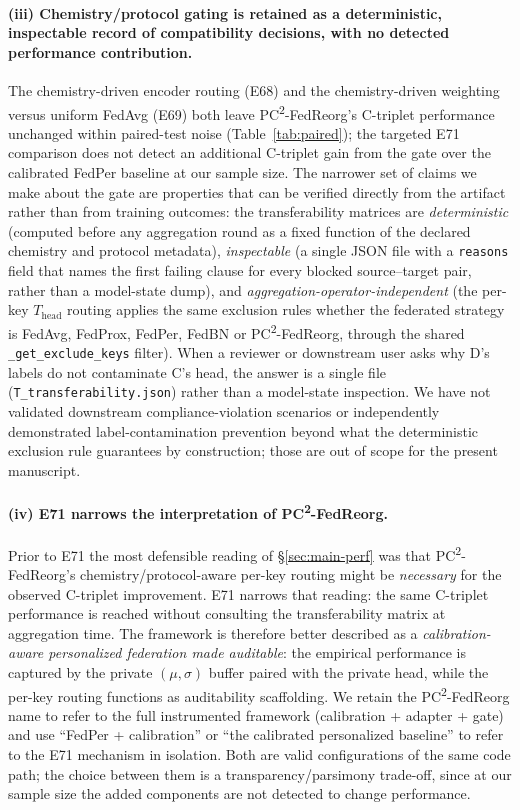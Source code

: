 \documentclass[11pt,a4paper]{article}
\newcommand{\PC}{PC\textsuperscript{2}-FedReorg}
\begin{document}
\paragraph{(iii) Chemistry/protocol gating is retained as a deterministic, inspectable record of compatibility decisions, with no detected performance contribution.} The chemistry-driven encoder routing (E68) and the chemistry-driven weighting versus uniform FedAvg (E69) both leave \PC{}'s C-triplet performance unchanged within paired-test noise (Table~\ref{tab:paired}); the targeted E71 comparison does not detect an additional C-triplet gain from the gate over the calibrated FedPer baseline at our sample size. The narrower set of claims we make about the gate are properties that can be verified directly from the artifact rather than from training outcomes: the transferability matrices are \emph{deterministic} (computed before any aggregation round as a fixed function of the declared chemistry and protocol metadata), \emph{inspectable} (a single JSON file with a \texttt{reasons} field that names the first failing clause for every blocked source--target pair, rather than a model-state dump), and \emph{aggregation-operator-independent} (the per-key $T_{\mathrm{head}}$ routing applies the same exclusion rules whether the federated strategy is FedAvg, FedProx, FedPer, FedBN or \PC{}, through the shared \texttt{\_get\_exclude\_keys} filter). When a reviewer or downstream user asks why D's labels do not contaminate C's head, the answer is a single file (\texttt{T\_transferability.json}) rather than a model-state inspection. We have not validated downstream compliance-violation scenarios or independently demonstrated label-contamination prevention beyond what the deterministic exclusion rule guarantees by construction; those are out of scope for the present manuscript.

\paragraph{(iv) E71 narrows the interpretation of \PC{}.} Prior to E71 the most defensible reading of \S\ref{sec:main-perf} was that \PC{}'s chemistry/protocol-aware per-key routing might be \emph{necessary} for the observed C-triplet improvement. E71 narrows that reading: the same C-triplet performance is reached without consulting the transferability matrix at aggregation time. The framework is therefore better described as a \emph{calibration-aware personalized federation made auditable}: the empirical performance is captured by the private $(\mu, \sigma)$ buffer paired with the private head, while the per-key routing functions as auditability scaffolding. We retain the \PC{} name to refer to the full instrumented framework (calibration + adapter + gate) and use ``FedPer + calibration'' or ``the calibrated personalized baseline'' to refer to the E71 mechanism in isolation. Both are valid configurations of the same code path; the choice between them is a transparency/parsimony trade-off, since at our sample size the added components are not detected to change performance.
\end{document}
